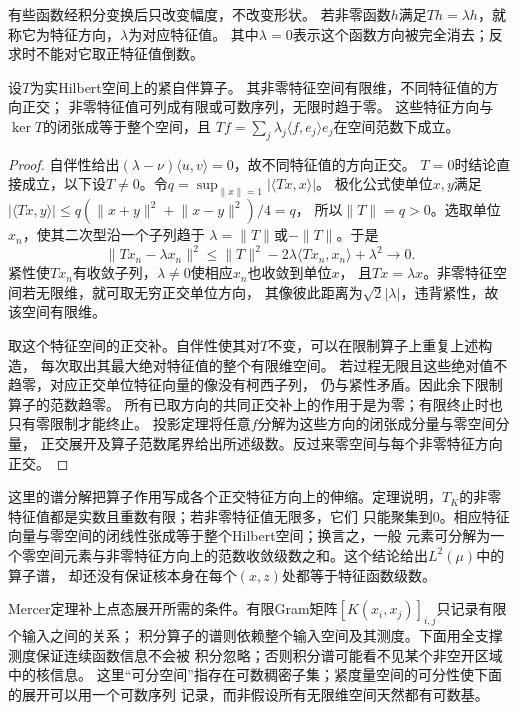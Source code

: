 有些函数经积分变换后只改变幅度，不改变形状。
若非零函数$h$满足$Th=\lambda h$，就称它为特征方向，$\lambda$为对应特征值。
其中$\lambda=0$表示这个函数方向被完全消去；反求时不能对它取正特征值倒数。


\begin{theorem}[紧自伴算子的正交分解]
\label{thm:functional-compact-selfadjoint-spectrum}
设$T$为实Hilbert空间上的紧自伴算子。
其非零特征空间有限维，不同特征值的方向正交；
非零特征值可列成有限或可数序列，无限时趋于零。
这些特征方向与$\ker T$的闭张成等于整个空间，且
$Tf=\sum_j\lambda_j\langle f,e_j\rangle e_j$在空间范数下成立。
\end{theorem}
\begin{proof}
自伴性给出$(\lambda-\nu)\langle u,v\rangle=0$，故不同特征值的方向正交。
$T=0$时结论直接成立，以下设$T\neq0$。令$q=\sup_{\lVert x\rVert=1}|\langle Tx,x\rangle|$。
极化公式使单位$x,y$满足
$|\langle Tx,y\rangle|\leq q(\lVert x+y\rVert^2+\lVert x-y\rVert^2)/4=q$，
所以$\lVert T\rVert=q>0$。选取单位$x_n$，使其二次型沿一个子列趋于
$\lambda=\lVert T\rVert$或$-\lVert T\rVert$。于是
\[
 \lVert Tx_n-\lambda x_n\rVert^2
 \leq\lVert T\rVert^2-2\lambda\langle Tx_n,x_n\rangle+\lambda^2\to0.
\]
紧性使$Tx_n$有收敛子列，$\lambda\neq0$使相应$x_n$也收敛到单位$x$，
且$Tx=\lambda x$。非零特征空间若无限维，就可取无穷正交单位方向，
其像彼此距离为$\sqrt2|\lambda|$，违背紧性，故该空间有限维。

取这个特征空间的正交补。自伴性使其对$T$不变，可以在限制算子上重复上述构造，
每次取出其最大绝对特征值的整个有限维空间。
若过程无限且这些绝对值不趋零，对应正交单位特征向量的像没有柯西子列，
仍与紧性矛盾。因此余下限制算子的范数趋零。
所有已取方向的共同正交补上的作用于是为零；有限终止时也只有零限制才能终止。
投影定理将任意$f$分解为这些方向的闭张成分量与零空间分量，
正交展开及算子范数尾界给出所述级数。反过来零空间与每个非零特征方向正交。
\end{proof}
这里的谱分解把算子作用写成各个正交特征方向上的伸缩。定理说明，$T_K$的非零
特征值都是实数且重数有限；若非零特征值无限多，它们
只能聚集到$0$。相应特征向量与零空间的闭线性张成等于整个Hilbert空间；换言之，一般
元素可分解为一个零空间元素与非零特征方向上的范数收敛级数之和。这个结论给出$L^2(\mu)$中的算子谱，
却还没有保证核本身在每个$(x,z)$处都等于特征函数级数。

Mercer定理补上点态展开所需的条件。有限Gram矩阵$[K(x_i,x_j)]_{i,j}$只记录有限个输入之间的关系；
积分算子的谱则依赖整个输入空间及其测度。下面用全支撑测度保证连续函数信息不会被
积分忽略；否则积分谱可能看不见某个非空开区域中的核信息。
这里“可分空间”指存在可数稠密子集；紧度量空间的可分性使下面的展开可以用一个可数序列
记录，而非假设所有无限维空间天然都有可数基。

